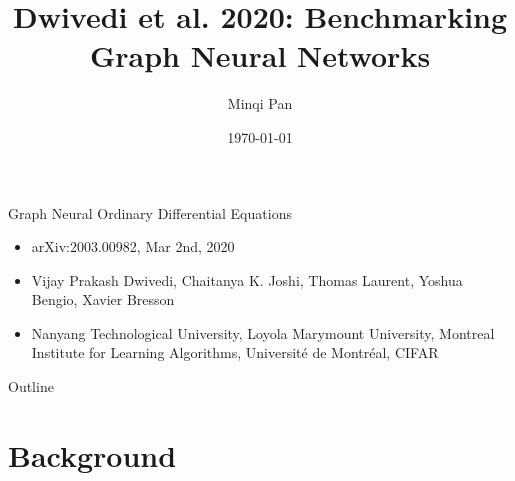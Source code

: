 \documentclass{beamer}
\title{Dwivedi et al. 2020: Benchmarking Graph Neural Networks}
\author{Minqi Pan}
\date{\today}
\begin{document}
\begin{frame}
  \titlepage
\end{frame}

\begin{frame}{Graph Neural Ordinary Differential Equations}
\begin{itemize}
\item arXiv:2003.00982, Mar 2nd, 2020
\item Vijay Prakash Dwivedi, Chaitanya K. Joshi, Thomas Laurent, Yoshua Bengio, Xavier Bresson
\item Nanyang Technological University, Loyola Marymount University, Montreal Institute for Learning Algorithms, Université de Montréal, CIFAR
\end{itemize}
\end{frame}

\begin{frame}{Outline}
  \tableofcontents
\end{frame}

\section{Background}
\end{document}

